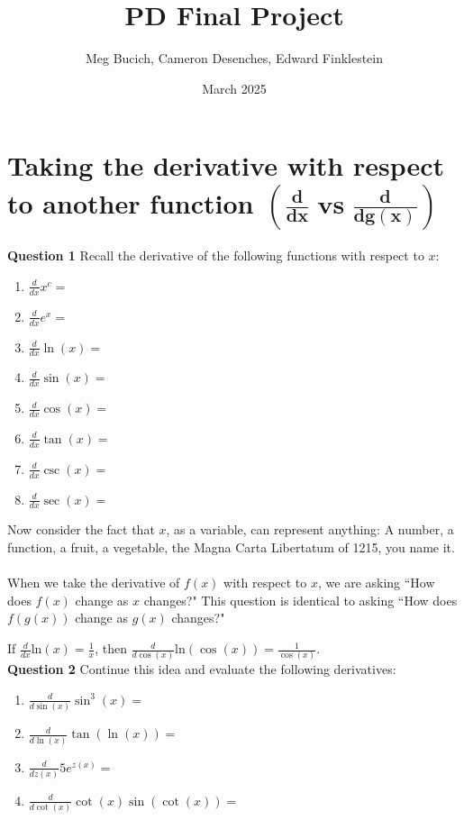 \documentclass{article}
\title{PD Final Project}
\author{Meg Bucich, Cameron Desenches, Edward Finklestein}
\date{March 2025}
\begin{document}
\maketitle

\section{Taking the derivative with respect to another function $\mathbf{\left(\frac{d}{dx} \textbf{ vs }\frac{d}{dg(x)}\right)}$}

\textbf{Question 1}
Recall the derivative of the following functions with respect to $x$:
\begin{multicols}{2}
  \begin{enumerate}[label=(\alph*)]
    \item $\frac{d}{dx}x^{c}=$  \item $\frac{d}{dx}e^{x}=$ \item $\frac{d}{dx}\ln(x)=$ \item $\frac{d}{dx}\sin(x)=$
    \item $\frac{d}{dx}\cos(x)=$ \item $\frac{d}{dx}\tan(x)=$ \item $\frac{d}{dx}\csc(x)=$ \item $\frac{d}{dx}\sec(x)=$
  \end{enumerate}
\end{multicols}
\vspace{.4cm}
\noindent Now consider the fact that $x$, as a variable, can represent anything: A number, a function, a fruit, a vegetable, the Magna Carta Libertatum of 1215, you name it. \\
\\
When we take the derivative of $f(x)$ with respect to $x$, we are asking ``How does $f(x)$ change as $x$ changes?" This question is identical to asking ``How does $f(g(x))$ change as $g(x)$ changes?" \\
\par\noindent If $\frac{d}{dx}$ln$(x)=\frac{1}{x}$, then $\frac{d}{d\cos(x)}$ln$(\cos(x))=\frac{1}{\cos(x)}$.\\

\noindent \textbf{Question 2}
Continue this idea and evaluate the following derivatives:
\begin{enumerate}[label=(\alph*)]
    \item $\frac{d}{d\sin(x)}\sin^{3}(x)=$\\
    \item $\frac{d}{d\ln(x)}\tan(\ln(x))=$ \\
    \item $\frac{d}{dz(x)}5e^{z(x)}=$ \\
    \item $\frac{d}{d\cot(x)}\cot(x)\sin(\cot(x))=$ 
\end{enumerate}
\pagebreak
\end{document}
